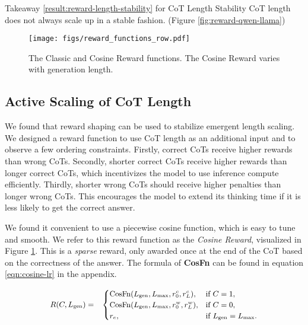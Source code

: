 \begin{AIbox}{Takeaway \hypersetup{hidelinks}\ref{result:reward-length-stability} for CoT Length Stability}
CoT length does not always scale up in a stable fashion. (Figure \ref{fig:reward-qwen-llama}) 
\end{AIbox}

\begin{figure}[tbp]
    \centering
    \texttt{[image: figs/reward\_functions\_row.pdf]}
    \vspace{-20pt}
    \caption{The Classic and Cosine Reward functions. The Cosine Reward varies with generation length.}
    \vspace{-10pt}
    \label{fig:reward-cosine}
\end{figure}

\subsection{Active Scaling of CoT Length}
\label{result:reward-length-scaling}

We found that reward shaping can be used to stabilize emergent length scaling. We designed a reward function to use CoT length as an additional input and to observe a few ordering constraints. Firstly, correct CoTs receive higher rewards than wrong CoTs. Secondly, shorter correct CoTs receive higher rewards than longer correct CoTs, which incentivizes the model to use inference compute efficiently. Thirdly, shorter wrong CoTs should receive higher penalties than longer wrong CoTs. This encourages the model to extend its thinking time if it is less likely to get the correct answer.

We found it convenient to use a piecewise cosine function, which is easy to tune and smooth. We refer to this reward function as the \textit{Cosine Reward}, visualized in Figure \ref{fig:reward-cosine}. This is a \textit{sparse} reward, only awarded once at the end of the CoT based on the correctness of the answer. The formula of \textbf{CosFn} can be found in equation \ref{eqn:cosine-lr} in the appendix.

\vspace{-10pt}
\begin{equation*}
\small
\label{eqn:reward-cosine}
\begin{aligned}
& R(C, L_{\text{gen}}) = 
&\begin{cases} 
    \text{CosFn}(L_{\text{gen}}, L_{\text{max}}, r_0^c, r_L^c),  & \text{if } C = 1, \\
    \text{CosFn} (L_{\text{gen}}, L_{\text{max}}, r_0^w, r_L^w),  & \text{if } C = 0, \\
    r_e, &\text{if } L_{\text{gen}} = L_{\text{max}}.
\end{cases}
\end{aligned}
\end{equation*}
\vspace{-25pt}

